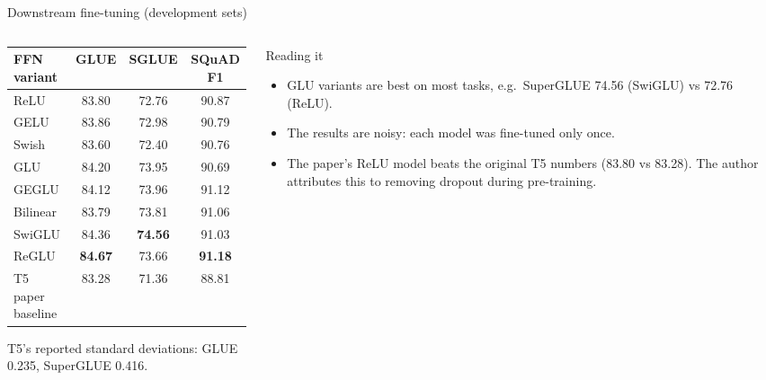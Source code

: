 \documentclass[aspectratio=169,11pt]{beamer}
\begin{document}
\begin{frame}{Downstream fine-tuning (development sets)}
  \begin{columns}[T]
    \begin{column}{0.52\textwidth}
      \scriptsize
      \begin{tabular}{@{}lccc@{}}
        \toprule
        FFN variant & GLUE & SGLUE & SQuAD F1\\
        \midrule
        ReLU & 83.80 & 72.76 & 90.87\\
        GELU & 83.86 & 72.98 & 90.79\\
        Swish & 83.60 & 72.40 & 90.76\\
        GLU & 84.20 & 73.95 & 90.69\\
        GEGLU & 84.12 & 73.96 & 91.12\\
        Bilinear & 83.79 & 73.81 & 91.06\\
        SwiGLU & 84.36 & \textbf{74.56} & 91.03\\
        ReGLU & \textbf{84.67} & 73.66 & \textbf{91.18}\\
        \midrule
        T5 paper baseline & 83.28 & 71.36 & 88.81\\
        \bottomrule
      \end{tabular}
      \vspace{1mm}

      {\scriptsize T5's reported standard deviations: GLUE 0.235, SuperGLUE 0.416.}
    \end{column}
    \begin{column}{0.44\textwidth}
      \begin{exampleblock}{Reading it}
        \small
        \begin{itemize}
          \item GLU variants are best on most tasks, e.g.\ SuperGLUE 74.56 (SwiGLU) vs 72.76 (ReLU).
          \item The results are noisy: each model was fine-tuned only once.
          \item The paper's ReLU model beats the original T5 numbers (83.80 vs 83.28). The author attributes this to removing dropout during pre-training.
        \end{itemize}
      \end{exampleblock}
    \end{column}
  \end{columns}
\end{frame}

\end{document}
